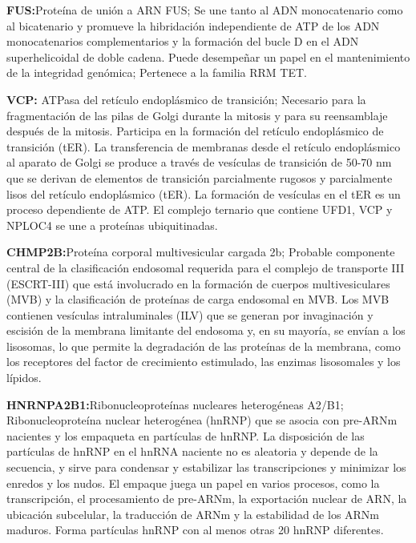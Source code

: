 \hfill

\textbf{FUS\cite{FUS}:}Proteína de unión a ARN FUS; Se une tanto al ADN monocatenario como al bicatenario y promueve la hibridación independiente de ATP de los ADN monocatenarios complementarios y la formación del bucle D en el ADN superhelicoidal de doble cadena. Puede desempeñar un papel en el mantenimiento de la integridad genómica; Pertenece a la familia RRM TET.

\hfill

\textbf{VCP\cite{VCP}:} ATPasa del retículo endoplásmico de transición; Necesario para la fragmentación de las pilas de Golgi durante la mitosis y para su reensamblaje después de la mitosis. Participa en la formación del retículo endoplásmico de transición (tER). La transferencia de membranas desde el retículo endoplásmico al aparato de Golgi se produce a través de vesículas de transición de 50-70 nm que se derivan de elementos de transición parcialmente rugosos y parcialmente lisos del retículo endoplásmico (tER). La formación de vesículas en el tER es un proceso dependiente de ATP. El complejo ternario que contiene UFD1, VCP y NPLOC4 se une a proteínas ubiquitinadas.

\hfill

\textbf{CHMP2B\cite{CHMP2B}:}Proteína corporal multivesicular cargada 2b; Probable componente central de la clasificación endosomal requerida para el complejo de transporte III (ESCRT-III) que está involucrado en la formación de cuerpos multivesiculares (MVB) y la clasificación de proteínas de carga endosomal en MVB. Los MVB contienen vesículas intraluminales (ILV) que se generan por invaginación y escisión de la membrana limitante del endosoma y, en su mayoría, se envían a los lisosomas, lo que permite la degradación de las proteínas de la membrana, como los receptores del factor de crecimiento estimulado, las enzimas lisosomales y los lípidos.

\hfill

\textbf{HNRNPA2B1\cite{HNRNPA2B1}:}Ribonucleoproteínas nucleares heterogéneas A2/B1; Ribonucleoproteína nuclear heterogénea (hnRNP) que se asocia con pre-ARNm nacientes y los empaqueta en partículas de hnRNP. La disposición de las partículas de hnRNP en el hnRNA naciente no es aleatoria y depende de la secuencia, y sirve para condensar y estabilizar las transcripciones y minimizar los enredos y los nudos. El empaque juega un papel en varios procesos, como la transcripción, el procesamiento de pre-ARNm, la exportación nuclear de ARN, la ubicación subcelular, la traducción de ARNm y la estabilidad de los ARNm maduros. Forma partículas hnRNP con al menos otras 20 hnRNP diferentes.

\newpage